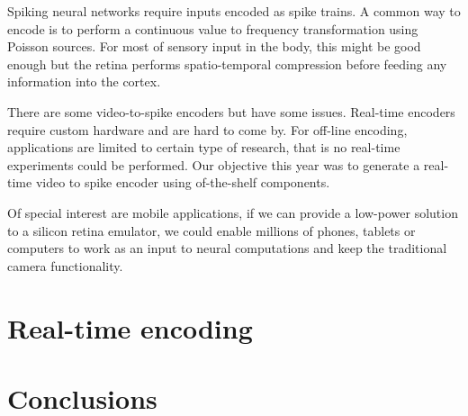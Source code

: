 Spiking neural networks require inputs encoded as spike trains. A common way to encode is to perform a continuous value to frequency transformation using Poisson sources. For most of sensory input in the body, this might be good enough but the retina performs spatio-temporal compression before feeding any information into the cortex.

There are some video-to-spike encoders but have some issues. Real-time encoders require custom hardware and are hard to come by. For off-line encoding, applications are limited to certain type of research, that is no real-time experiments could be performed. Our objective this year was to generate a real-time video to spike encoder using of-the-shelf components. 

Of special interest are mobile applications, if we can provide a low-power solution to a silicon retina emulator, we could enable millions of phones, tablets or computers to work as an input to neural computations and keep the traditional camera functionality.

\section{Real-time encoding}

%

%
\section{Conclusions}
